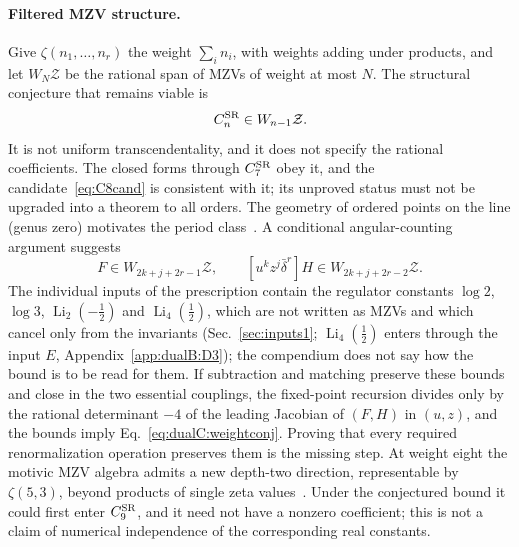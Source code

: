 \documentclass[11pt,a4paper]{article}
\numberwithin{equation}{section}
\newcommand{\CSR}{C^{\rm SR}}
\newcommand{\db}{\bar\delta}
\newcommand{\Li}{\operatorname{Li}}
\begin{document}
\paragraph{Filtered MZV structure.} Give $\zeta(n_1,\ldots,n_r)$ the weight $\sum_in_i$, with weights adding under
products, and let $W_N\mathcal Z$ be the rational span of MZVs of weight at most $N$. The structural conjecture that
remains viable is
\begin{equation}
 \CSR_n\in W_{n-1}\mathcal Z .
 \label{eq:dualC:weightconj}
\end{equation}
It is not uniform transcendentality, and it does not specify the rational coefficients. The closed forms through
$\CSR_7$ obey it, and the candidate~\eqref{eq:C8cand} is consistent with it; its unproved status must not be upgraded
into a theorem to all orders. The geometry of ordered points on the line (genus zero) motivates the period
class~\cite{Brown:2009qja,Brown:2011uzk}. A conditional angular-counting argument suggests
\begin{equation}
 [u^kz^j\db^r]F\in W_{2k+j+2r-1}\mathcal Z,\qquad [u^kz^j\db^r]H\in W_{2k+j+2r-2}\mathcal Z .
\end{equation}
The individual inputs of the prescription contain the regulator constants $\log2$, $\log3$, $\Li_2(-\frac12)$ and
$\Li_4(\frac12)$, which are not written as MZVs and which cancel only from the invariants (Sec.~\ref{sec:inputs1}; $\Li_4(\frac12)$ enters through the input $E$,
Appendix~\ref{app:dualB:D3});
the compendium does not say how the bound is to be read for them. If subtraction and matching preserve these bounds and
close in the two essential couplings, the fixed-point recursion divides only by the rational determinant $-4$ of the
leading Jacobian of $(F,H)$ in $(u,z)$, and the bounds imply Eq.~\eqref{eq:dualC:weightconj}. Proving that every
required renormalization operation preserves them is the missing step. At weight eight the motivic MZV algebra admits a
new depth-two direction, representable by $\zeta(5,3)$, beyond products of single zeta values~\cite{Brown:2013depth}.
Under the conjectured bound it could first enter $\CSR_9$, and it need not have a nonzero coefficient; this is not a
claim of numerical independence of the corresponding real constants.
\end{document}
